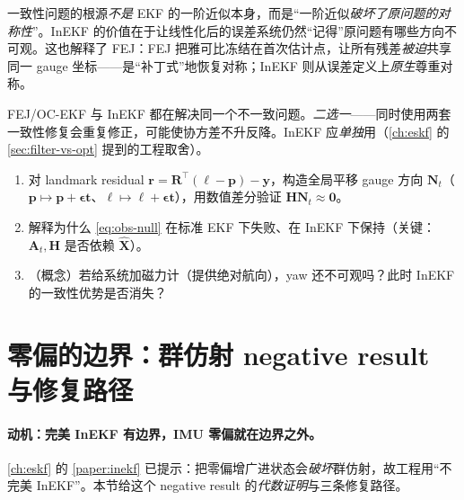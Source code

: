 \begin{insight}[一致性的真正根源]
一致性问题的根源\emph{不是} EKF 的一阶近似本身，而是“一阶近似\emph{破坏了原问题的对称性}”。InEKF 的价值在于让线性化后的误差系统仍然“记得”原问题有哪些方向不可观。这也解释了 FEJ：FEJ 把雅可比冻结在首次估计点，让所有残差\emph{被迫}共享同一 gauge 坐标——是“补丁式”地恢复对称；InEKF 则从误差定义上\emph{原生}尊重对称。
\end{insight}

\begin{pitfall}
FEJ/OC-EKF 与 InEKF 都在解决同一个不一致问题。\emph{二选一}——同时使用两套一致性修复会重复修正，可能使协方差不升反降。InEKF 应\emph{单独}用（\cref{ch:eskf} 的 \cref{sec:filter-vs-opt} 提到的工程取舍）。
\end{pitfall}

\begin{practice}
\begin{enumerate}
  \item 对 landmark residual $\mathbf{r}=\mathbf{R}^\top(\boldsymbol{\ell}-\mathbf{p})-\mathbf{y}$，构造全局平移 gauge 方向 $\mathbf{N}_t$（$\mathbf{p}\mapsto\mathbf{p}+\boldsymbol{\epsilon}\mathbf{t}$、$\boldsymbol{\ell}\mapsto\boldsymbol{\ell}+\boldsymbol{\epsilon}\mathbf{t}$），用数值差分验证 $\mathbf{H}\mathbf{N}_t\approx\mathbf{0}$。
  \item 解释为什么 \cref{eq:obs-null} 在标准 EKF 下失败、在 InEKF 下保持（关键：$\mathbf{A}_t,\mathbf{H}$ 是否依赖 $\hat{\mathbf{X}}$）。
  \item （概念）若给系统加磁力计（提供绝对航向），yaw 还不可观吗？此时 InEKF 的一致性优势是否消失？
\end{enumerate}
\end{practice}

\section{零偏的边界：群仿射 negative result 与修复路径}
\label{sec:bias-negative}

\paragraph{动机：完美 InEKF 有边界，IMU 零偏就在边界之外。}
\cref{ch:eskf} 的 \cref{paper:inekf} 已提示：把零偏增广进状态会\emph{破坏}群仿射，故工程用“不完美 InEKF”。本节给这个 negative result 的\emph{代数证明}与三条修复路径。

